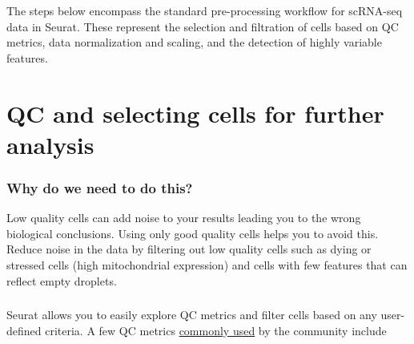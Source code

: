 \documentclass[
]{book}
\begin{document}
The steps below encompass the standard pre-processing workflow for scRNA-seq data in Seurat. These represent the selection and filtration of cells based on QC metrics, data normalization and scaling, and the detection of highly variable features.

\hypertarget{qc-and-selecting-cells-for-further-analysis}{%
\section{QC and selecting cells for further analysis}\label{qc-and-selecting-cells-for-further-analysis}}

\hypertarget{why-do-we-need-to-do-this}{%
\subsubsection*{Why do we need to do this?}\label{why-do-we-need-to-do-this}}

Low quality cells can add noise to your results leading you to the wrong biological conclusions. Using only good quality cells helps you to avoid this. Reduce noise in the data by filtering out low quality cells such as dying or stressed cells (high mitochondrial expression) and cells with few features that can reflect empty droplets.

\hypertarget{section-1}{%
\subsubsection*{}\label{section-1}}

Seurat allows you to easily explore QC metrics and filter cells based on any user-defined criteria. A few QC metrics \href{https://www.ncbi.nlm.nih.gov/pmc/articles/PMC4758103/}{commonly used} by the community include
\end{document}
